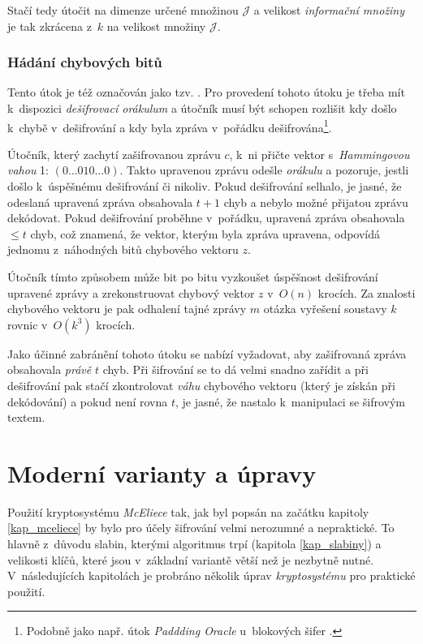 \documentclass[thesis=M,czech,hidelinks]{FITthesis}[2012/06/26]
\newcommand{\0}{{\textcolor[gray]{0.80}{0}}}
\begin{document}
Stačí tedy útočit na dimenze určené množinou $\mathcal{J}$ a velikost
\emph{informační množiny} je tak zkrácena z~$k$ na velikost množiny
$\mathcal{J}$.


\subsubsection{Hádání chybových bitů}
Tento útok je též označován jako tzv. . Pro provedení tohoto
útoku je třeba mít k~dispozici \emph{dešifrovací orákulum} a útočník musí být
schopen rozlišit kdy došlo k~chybě v~dešifrování a kdy byla zpráva v~pořádku
dešifrována\footnote{
    Podobně jako např. útok \emph{Paddding Oracle} u~blokových šifer
    \cite{FIT_KRY}.
}.

Útočník, který zachytí zašifrovanou zprávu $c$, k~ni přičte vektor
s~\emph{Hammingovou vahou} 1: $\left(0\ldots010\ldots0\right)$. Takto upravenou
zprávu odešle \emph{orákulu} a pozoruje, jestli došlo k~úspěšnému dešifrování či
nikoliv. Pokud dešifrování selhalo, je jasné, že odeslaná upravená zpráva
obsahovala $t+1$ chyb a nebylo možné přijatou zprávu dekódovat. Pokud
dešifrování proběhne v~pořádku, upravená zpráva obsahovala $\leq t$ chyb, což
znamená, že vektor, kterým byla zpráva upravena, odpovídá jednomu z~náhodných
bitů chybového vektoru $z$.

Útočník tímto způsobem může bit po bitu vyzkoušet úspěšnost dešifrování upravené
zprávy a zrekonstruovat chybový vektor $z$ v~$O\left( n \right)$ krocích. Za
znalosti chybového vektoru je pak odhalení tajné zprávy $m$ otázka vyřešení
soustavy $k$ rovnic v~$O\left( k^3 \right)$ krocích.

Jako účinné zabránění tohoto útoku se nabízí vyžadovat, aby zašifrovaná zpráva
obsahovala \emph{právě} $t$ chyb. Při šifrování se to dá velmi snadno zařídit a
při dešifrování pak stačí zkontrolovat \emph{váhu} chybového vektoru (který je
získán při dekódování) a pokud není rovna $t$, je jasné, že nastalo k~manipulaci
se šifrovým textem.


\vfill


\section{Moderní varianty a úpravy}
Použití kryptosystému \emph{McEliece} tak, jak byl popsán na začátku kapitoly
\ref{kap_mceliece} by bylo pro účely šifrování velmi nerozumné a nepraktické. To
hlavně z~důvodu slabin, kterými algoritmus trpí (kapitola \ref{kap_slabiny})
a velikosti klíčů, které jsou v~základní variantě větší než je nezbytně nutné.
V~následujících kapitolách je probráno několik úprav \emph{kryptosystému} pro
praktické použití.
\end{document}

